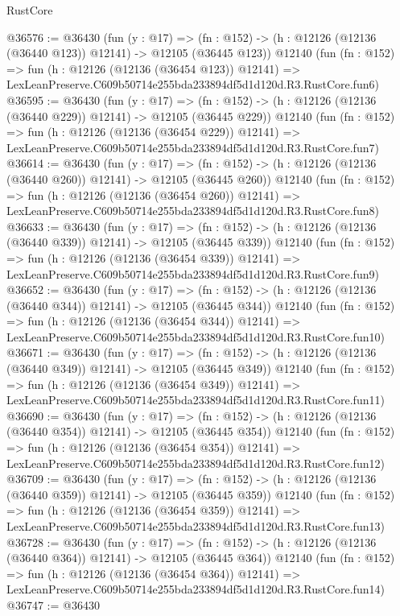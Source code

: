 \begin{lexlean}{RustCore}
\begin{coremodule}
@36576 := @36430
    (fun (y : @17) =>
    (fn : @152) -> (h : @12126 (@12136 (@36440 @123)) @12141) -> @12105 (@36445 @123))
    @12140
    (fun (fn : @152) =>
    fun (h : @12126 (@12136 (@36454 @123)) @12141) =>
    LexLeanPreserve.C609b50714e255bda233894df5d1d120d.R3.RustCore.fun6)
@36595 := @36430
    (fun (y : @17) =>
    (fn : @152) -> (h : @12126 (@12136 (@36440 @229)) @12141) -> @12105 (@36445 @229))
    @12140
    (fun (fn : @152) =>
    fun (h : @12126 (@12136 (@36454 @229)) @12141) =>
    LexLeanPreserve.C609b50714e255bda233894df5d1d120d.R3.RustCore.fun7)
@36614 := @36430
    (fun (y : @17) =>
    (fn : @152) -> (h : @12126 (@12136 (@36440 @260)) @12141) -> @12105 (@36445 @260))
    @12140
    (fun (fn : @152) =>
    fun (h : @12126 (@12136 (@36454 @260)) @12141) =>
    LexLeanPreserve.C609b50714e255bda233894df5d1d120d.R3.RustCore.fun8)
@36633 := @36430
    (fun (y : @17) =>
    (fn : @152) -> (h : @12126 (@12136 (@36440 @339)) @12141) -> @12105 (@36445 @339))
    @12140
    (fun (fn : @152) =>
    fun (h : @12126 (@12136 (@36454 @339)) @12141) =>
    LexLeanPreserve.C609b50714e255bda233894df5d1d120d.R3.RustCore.fun9)
@36652 := @36430
    (fun (y : @17) =>
    (fn : @152) -> (h : @12126 (@12136 (@36440 @344)) @12141) -> @12105 (@36445 @344))
    @12140
    (fun (fn : @152) =>
    fun (h : @12126 (@12136 (@36454 @344)) @12141) =>
    LexLeanPreserve.C609b50714e255bda233894df5d1d120d.R3.RustCore.fun10)
@36671 := @36430
    (fun (y : @17) =>
    (fn : @152) -> (h : @12126 (@12136 (@36440 @349)) @12141) -> @12105 (@36445 @349))
    @12140
    (fun (fn : @152) =>
    fun (h : @12126 (@12136 (@36454 @349)) @12141) =>
    LexLeanPreserve.C609b50714e255bda233894df5d1d120d.R3.RustCore.fun11)
@36690 := @36430
    (fun (y : @17) =>
    (fn : @152) -> (h : @12126 (@12136 (@36440 @354)) @12141) -> @12105 (@36445 @354))
    @12140
    (fun (fn : @152) =>
    fun (h : @12126 (@12136 (@36454 @354)) @12141) =>
    LexLeanPreserve.C609b50714e255bda233894df5d1d120d.R3.RustCore.fun12)
@36709 := @36430
    (fun (y : @17) =>
    (fn : @152) -> (h : @12126 (@12136 (@36440 @359)) @12141) -> @12105 (@36445 @359))
    @12140
    (fun (fn : @152) =>
    fun (h : @12126 (@12136 (@36454 @359)) @12141) =>
    LexLeanPreserve.C609b50714e255bda233894df5d1d120d.R3.RustCore.fun13)
@36728 := @36430
    (fun (y : @17) =>
    (fn : @152) -> (h : @12126 (@12136 (@36440 @364)) @12141) -> @12105 (@36445 @364))
    @12140
    (fun (fn : @152) =>
    fun (h : @12126 (@12136 (@36454 @364)) @12141) =>
    LexLeanPreserve.C609b50714e255bda233894df5d1d120d.R3.RustCore.fun14)
@36747 := @36430

\end{coremodule}
\end{lexlean}
